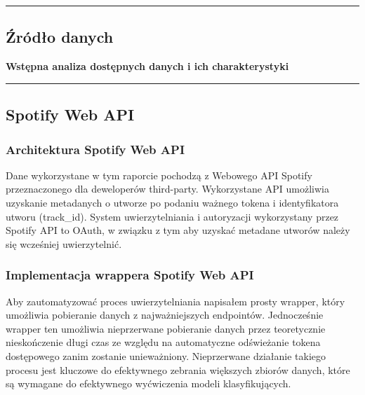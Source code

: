 {\color{gray}\hrule}
\begin{center}
\section{Źródło danych}
\textbf{Wstępna analiza dostępnych danych i ich charakterystyki}
\end{center}
{\color{gray}\hrule}
\begin{multicols}{2}
\subsection{Spotify Web API}
\subsubsection{Architektura Spotify Web API}
Dane wykorzystane w tym raporcie pochodzą z Webowego API Spotify przeznaczonego dla deweloperów third-party. Wykorzystane API umożliwia uzyskanie metadanych o utworze po podaniu ważnego tokena i identyfikatora utworu (track\_id). System uwierzytelniania i autoryzacji wykorzystany przez Spotify API to OAuth, w związku z tym aby uzyskać metadane utworów należy się wcześniej uwierzytelnić.
\subsubsection{Implementacja wrappera Spotify Web API}
Aby zautomatyzować proces uwierzytelniania napisałem prosty wrapper, który umożliwia pobieranie danych z najważniejszych endpointów. Jednocześnie wrapper ten umożliwia nieprzerwane pobieranie danych przez teoretycznie nieskończenie długi czas ze względu na automatyczne odświeżanie tokena dostępowego zanim zostanie unieważniony. Nieprzerwane działanie takiego procesu jest kluczowe do efektywnego zebrania większych zbiorów danych, które są wymagane do efektywnego wyćwiczenia modeli klasyfikujących.

\end{multicols}
